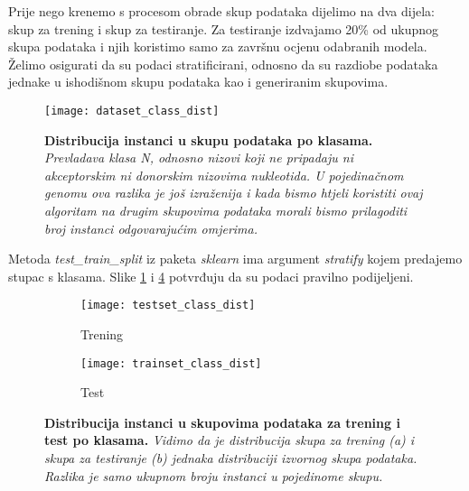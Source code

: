 Prije nego krenemo s procesom obrade skup podataka dijelimo na dva dijela: skup za trening i skup za testiranje. Za testiranje izdvajamo 20\% od ukupnog skupa podataka i njih koristimo samo za završnu ocjenu odabranih modela. Želimo osigurati da su podaci stratificirani, odnosno da su razdiobe podataka jednake u ishodišnom skupu podataka kao i generiranim skupovima. 
\begin{center}
   \begin{figure}[ht!]
      \begin{center}
         \texttt{[image: dataset\_class\_dist]}
         \caption[Distribucija instanci u skupu podataka po klasama]
         {\textbf{Distribucija instanci u skupu podataka po klasama.} \textit{Prevladava klasa N, odnosno nizovi koji ne pripadaju ni akceptorskim ni donorskim nizovima nukleotida. U pojedinačnom genomu ova razlika je još izraženija \cite{Brown01} i kada bismo htjeli koristiti ovaj algoritam na drugim skupovima podataka morali bismo prilagoditi broj instanci odgovarajućim omjerima.}}
         \label{fig:dist_orig}
      \end{center}
   \end{figure}
\end{center}

Metoda \textit{test{\_}train{\_}split} iz paketa \textit{sklearn} ima argument \textit{stratify} kojem predajemo stupac s klasama. Slike \ref{fig:dist_orig} i \ref{fig:dist_train_test} potvrđuju da su podaci pravilno podijeljeni.

\begin{center}
   \begin{figure}[ht!]
   \begin{subfigure}{.5\textwidth}
         \texttt{[image: testset\_class\_dist]}
         \caption{Trening}
         \label{fig:dist_train}
   \end{subfigure}
   \begin{subfigure}{.5\textwidth}
         \texttt{[image: trainset\_class\_dist]}
         \caption{Test}
         \label{fig:dist_test}
   \end{subfigure}
   \caption[Distribucija instanci u skupovima podataka za trening i test]
   {\textbf{Distribucija instanci u skupovima podataka za trening i test po klasama.} \textit{Vidimo da je distribucija skupa za trening (a) i skupa za testiranje (b) jednaka distribuciji izvornog skupa podataka. Razlika je samo ukupnom broju instanci u pojedinome skupu.}}
    \label{fig:dist_train_test}
   \end{figure}
\end{center}

